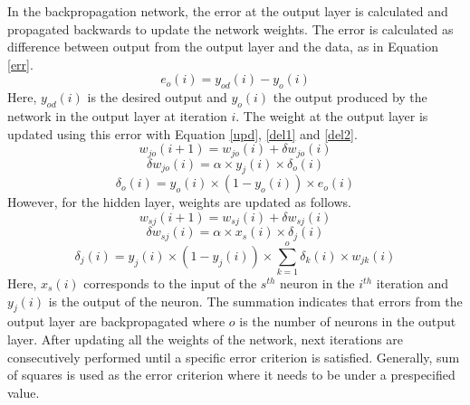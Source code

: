 \documentclass[preprint,review,12pt]{elsarticle}
\begin{document}
In the backpropagation network, the error at the output layer is calculated and propagated backwards to update the network weights. The error is calculated as difference between output from the output layer and the data, as in Equation \ref{err}.
\begin{equation}
e_{o}(i)=y_{od}(i)-y_{o}(i)
\label{err}
\end{equation}
Here, $y_{od}(i)$ is the desired output and $y_{o}(i)$ the output produced by the network in the output layer at iteration $i$. The weight at the output layer is updated using this error with Equation \ref{upd}, \ref{del1} and \ref{del2}. 
\begin{equation} \label{upd}
w_{jo}(i+1)=w_{jo}(i)+\delta w_{jo}(i)
\end{equation}
\begin{equation} \label{del1}
\delta w_{jo}(i)=\alpha\times y_{j}(i)\times \delta_{o}(i)
\end{equation}
\begin{equation} \label{del2}
\delta_{o}(i)=y_{o}(i)\times(1-y_{o}(i))\times e_{o}(i)
\end{equation}
However, for the hidden layer, weights are updated as follows.
\begin{equation}
w_{sj}(i+1)=w_{sj}(i)+\delta w_{sj}(i)
\end{equation}
\begin{equation}
\delta w_{sj}(i)=\alpha\times x_{s}(i)\times \delta_{j}(i)
\end{equation}
\begin{equation}
\delta_{j}(i)=y_{j}(i)\times(1-y_{j}(i))\times \sum_{k=1}^{o} \delta_{k}(i)\times w_{jk}(i)
\end{equation}
Here, $x_{s}(i)$ corresponds to the input of the $s^{th}$ neuron in the $i^{th}$ iteration and $y_{j}(i)$ is the output of the neuron. The summation indicates that errors from the output layer are backpropagated where $o$ is the number of neurons in the output layer. After updating all the weights of the network, next iterations are consecutively performed until a specific error criterion is satisfied. Generally, sum of squares is used as the error criterion where it needs to be under a prespecified value. 
\end{document}
